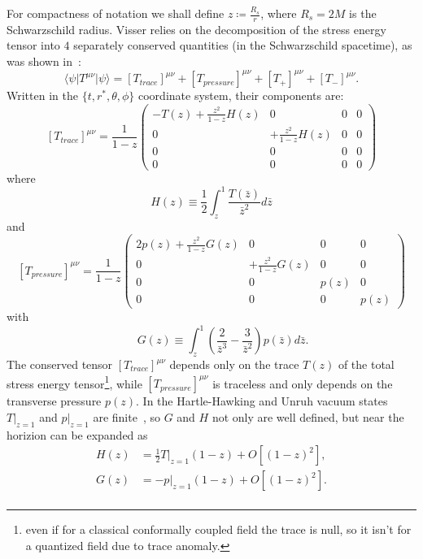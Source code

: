 For compactness of notation we shall define \(z \coloneqq \frac{R_s}{r}\), where \(R_s = 2M\) is the Schwarzschild radius.
Visser relies on the decomposition of the stress energy tensor into \(4\) separately conserved quantities (in the Schwarzschild spacetime), as was shown in~\cite[]{christensen1977trace}: 
\[
    \langle\psi\vert T^{\mu\nu}\vert\psi\rangle = \left[T_{trace}\right]^{\mu\nu} + \left[T_{pressure}\right]^{\mu\nu} +
    \left[T_{+}\right]^{\mu\nu} + \left[T_{-}\right]^{\mu\nu}.
\]
Written in the \(\{t, r^*, \theta, \phi\}\) coordinate system, their components are:
\[
    \left[T_{trace}\right]^{\mu\nu} = \frac{1}{1 - z}\begin{pmatrix}
        -T(z) + \frac{z^2}{1 - z}H(z) & 0 & 0 & 0 \\
        0 & + \frac{z^2}{1 - z}H(z) & 0 & 0 \\
        0 & 0 & 0 & 0 \\
        0 & 0 & 0 & 0
    \end{pmatrix} 
\]
where 
\[
    H(z)\equiv \frac{1}{2}\int_{z}^{1} \frac{T(\bar{z})}{\bar{z}^2}d\bar{z}    
\]
and 
\[
    \left[T_{pressure}\right]^{\mu\nu} = \frac{1}{1 - z}
    \begin{pmatrix}
        2p(z) + \frac{z^2}{1 - z}G(z) & 0 & 0 & 0 \\
        0 & + \frac{z^2}{1 - z}G(z) & 0 & 0 \\
        0 & 0 & p(z) & 0 \\
        0 & 0 & 0 & p(z)
    \end{pmatrix} 
\]
with 
\[
    \quad \quad G(z)\equiv \int_{z}^{1} \left(\frac{2}{\bar{z}^3} - \frac{3}{\bar{z}^2}\right)p(\bar{z})d\bar{z}.    
\]
The conserved tensor \(\left[T_{trace}\right]^{\mu\nu}\) depends only on the trace \(T(z)\) of the total stress energy tensor\footnote{even if for a classical conformally coupled field the trace is null, so it isn't for a quantized field due to trace anomaly.}, while \(\left[T_{pressure}\right]^{\mu\nu}\) is traceless and only depends on the transverse pressure \(p(z)\). In the Hartle-Hawking and Unruh vacuum states \(T\vert_{z = 1}\) and \(p\vert_{z = 1}\) are finite~\cite[]{christensen1977trace,jensen1991renormalized}, so \(G\) and \(H\) not only are well defined, but near the horizion can be expanded as 
\begin{align*}
    H(z) &= \frac{1}{2}T\vert_{z = 1}(1 - z) + O[(1 - z)^2],\\
    G(z) &= -p\vert_{z = 1}(1 - z) + O[(1 - z)^2].\\
\end{align*}


